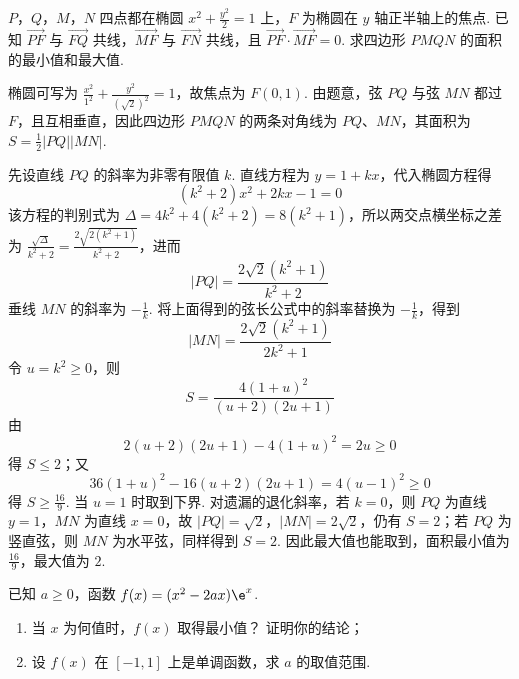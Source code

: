 \begin{problem}
\(P\)，\(Q\)，\(M\)，\(N\) 四点都在椭圆 \(x^{2} + \frac{y^{2}}{2} = 1\) 上，\(F\) 为椭圆在 \(y\) 轴正半轴上的焦点. 已知 \(\overrightarrow{PF}\) 与 \(\overrightarrow{FQ}\) 共线，\(\overrightarrow{MF}\) 与 \(\overrightarrow{FN}\) 共线，且 \(\overrightarrow{PF} \cdot \overrightarrow{MF} = 0\). 求四边形 \(PMQN\) 的面积的最小值和最大值.
\end{problem}

\begin{solution}
椭圆可写为 \(\frac{x^2}{1^2}+\frac{y^2}{(\sqrt2)^2}=1\)，故焦点为 \(F(0,1)\). 由题意，弦 \(PQ\) 与弦 \(MN\) 都过 \(F\)，且互相垂直，因此四边形 \(PMQN\) 的两条对角线为 \(PQ\)、\(MN\)，其面积为 \(S=\frac12|PQ||MN|\).

先设直线 \(PQ\) 的斜率为非零有限值 \(k\). 直线方程为 \(y=1+kx\)，代入椭圆方程得
\[
(k^2+2)x^2+2kx-1=0
\]
该方程的判别式为 \(\Delta=4k^2+4(k^2+2)=8(k^2+1)\)，所以两交点横坐标之差为 \(\frac{\sqrt{\Delta}}{k^2+2}=\frac{2\sqrt{2(k^2+1)}}{k^2+2}\)，进而
\[
|PQ|=\frac{2\sqrt2(k^2+1)}{k^2+2}
\]
垂线 \(MN\) 的斜率为 \(-\frac{1}{k}\). 将上面得到的弦长公式中的斜率替换为 \(-\frac{1}{k}\)，得到
\[
|MN|=\frac{2\sqrt2(k^2+1)}{2k^2+1}
\]
令 \(u=k^2\geqslant0\)，则
\[
S=\frac{4(1+u)^2}{(u+2)(2u+1)}
\]
由
\[
2(u+2)(2u+1)-4(1+u)^2=2u\geqslant0
\]
得 \(S\leqslant2\)；又
\[
36(1+u)^2-16(u+2)(2u+1)=4(u-1)^2\geqslant0
\]
得 \(S\geqslant\frac{16}{9}\). 当 \(u=1\) 时取到下界. 对遗漏的退化斜率，若 \(k=0\)，则 \(PQ\) 为直线 \(y=1\)，\(MN\) 为直线 \(x=0\)，故 \(|PQ|=\sqrt{2}\)，\(|MN|=2\sqrt{2}\)，仍有 \(S=2\)；若 \(PQ\) 为竖直弦，则 \(MN\) 为水平弦，同样得到 \(S=2\). 因此最大值也能取到，面积最小值为 \(\frac{16}{9}\)，最大值为 \(2\).
\end{solution}

\begin{problem}
已知 \(a \geqslant 0\)，函数 \(f(x) = (x^2 - 2ax)\e^x\).

\begin{enumerate}
\item 当 \(x\) 为何值时，\(f(x)\) 取得最小值？ 证明你的结论；
\item 设 \(f(x)\) 在 \([-1,1]\) 上是单调函数，求 \(a\) 的取值范围.
\end{enumerate}
\end{problem}


